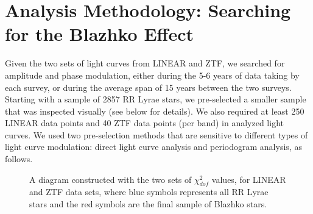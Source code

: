 \section{Analysis Methodology: Searching for the Blazhko Effect  \label{sec:analysis}}  

Given the two sets of light curves from LINEAR and ZTF, we searched for amplitude and phase modulation,
either during the 5-6 years of data taking by each survey, or during the average span of 15 years between the two
surveys. Starting with a sample of 2857 RR Lyrae stars, we pre-selected a smaller sample that was inspected
visually (see below for details). We also required at least 250 LINEAR data points and 40 ZTF data points (per band)
in analyzed light curves. We used two pre-selection methods that are sensitive to different types of light curve
modulation: direct light curve analysis and periodogram analysis, as follows.
 
\begin{figure}
\caption{A diagram constructed with the two sets of $\chi^2_{dof}$ values, for LINEAR and ZTF data sets, where
         blue symbols represents all RR Lyrae stars and the red symbols are the final sample of Blazhko stars.}
\label{fig:chi2}
\end{figure}


